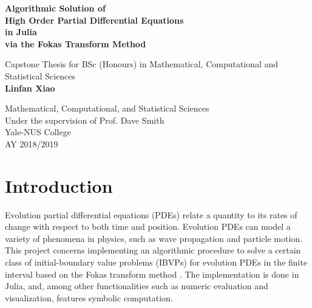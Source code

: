 \documentclass[12pt, oneside, a4paper]{article}
\begin{document}
\begin{titlepage}
\begin{center}
\vspace{1cm}
\LARGE
\textbf{Algorithmic Solution of\\ High Order Partial Differential Equations\\
in Julia\\ via the Fokas Transform Method}

\Large
\vspace{.5cm}
Capstone Thesis for BSc (Honours) in
Mathematical, Computational and Statistical Sciences\\
\vspace{.5cm}
\textbf{Linfan Xiao}\\
\vspace{.5cm}
\Large
\vspace{.5cm}
\Large
\end{center}

\vfill
\large
\begin{center}	
Mathematical, Computational, and Statistical Sciences\\
Under the supervision of Prof. Dave Smith\\
Yale-NUS College\\
AY 2018/2019\\
\end{center}
\end{titlepage}
\tableofcontents
\pagebreak
{}

\pagebreak
{}

\section{Introduction}\label{sec:intro}
Evolution partial differential equations (PDEs) relate a quantity to its rates of change with respect to both time and position. Evolution PDEs can model a variety of phenomena in physics, such as wave propagation and particle motion. This project concerns implementing an algorithmic procedure to solve a certain class of initial-boundary value problems (IBVPs) for evolution PDEs in the finite interval \cite{Smith2016} based on the Fokas transform method \cite{Fokas2008}\cite{Fokas2000}\cite{Fokas2001}\cite{Smith2012}\cite{Deconinck2014}\cite{Fokas2015}. The implementation is done in Julia, and, among other functionalities such as numeric evaluation and visualization, features symbolic computation.
\end{document}
